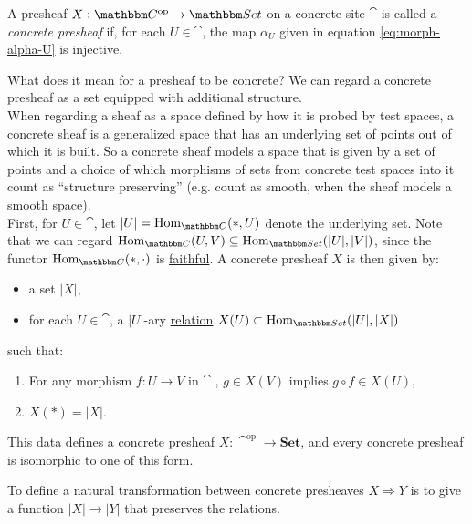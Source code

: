 \documentclass[a4paper,11pt]{article}  %
\begin{document}
\begin{definition}
	A {presheaf} $X : \cat^\op \to \Set$ on a {concrete site} $\cat$ is called a \emph{concrete presheaf} if, for each $U \in \cat$, the map $\alpha_U$ given in equation \eqref{eq:morph-alpha-U} is injective.
\end{definition}

\begin{remark}
	What does it mean for a presheaf to be concrete?
	 We can regard a concrete presheaf as a set equipped with additional structure. \\
	When regarding a sheaf as a space defined by how it is probed by test spaces, a concrete sheaf is a generalized space that has an underlying set of points out of which it is built.
	So a concrete sheaf models a space that is given by a set of points and a choice of which morphisms of sets from concrete test spaces into it count as “structure preserving” (e.g. count as smooth, when the sheaf models a smooth space).
	\\
	First, for $U \in \cat$, let $|U|=\Hom_{\cat}(*,U)$ denote the underlying set. 
	Note that we can regard $\Hom_{\cat}(U, V) \subseteq \Hom_{\Set} (|U|, |V|)$, since the functor $\Hom_{\cat}(*,\cdot)$  is \href{https://ncatlab.org/nlab/show/faithful+functor}{faithful}.
	A concrete presheaf \(X\) is then given by:
	\begin{itemize}
		\item  a set $|X|$,
		\item  for each $U \in \cat$, a $|U|$-ary \href{https://ncatlab.org/nlab/show/relation\#DefinitionGeneralCase}{relation} $X(U) \subset  \Hom_{\Set} (|U|,|X|)$%
	\end{itemize}
	such that:
	\begin{enumerate}
		\item For any morphism $f : U \to V$ in $\cat$ , $ g \in X(V)$ implies $g \circ f \in X(U)$, 
		\item $X(*) = |X|$.
	\end{enumerate}

This data defines a concrete presheaf \(X : \cat^{\mathrm{op}} \to \mathbf{Set}\), and every concrete presheaf is isomorphic to one of this form.

\end{remark}






To define a natural transformation between concrete presheaves \(X \Rightarrow Y\) is to give a function \(|X| \to |Y|\) that preserves the relations.
\end{document}

